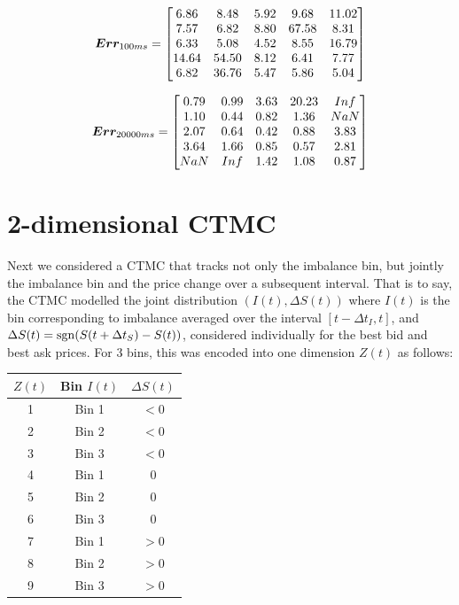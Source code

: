 $$\boldsymbol{Err}_{100ms} = \begin{bmatrix}
    6.86 &   8.48 &   5.92 &   9.68 &  11.02\\
    7.57 &   6.82 &   8.80 &  67.58 &   8.31\\
    6.33 &   5.08 &   4.52 &   8.55 &  16.79\\
   14.64 &  54.50 &   8.12 &   6.41 &   7.77\\
    6.82 &  36.76 &   5.47 &   5.86 &   5.04
\end{bmatrix}$$

$$\boldsymbol{Err}_{20000ms} = \begin{bmatrix}
    0.79 &   0.99 &   3.63 &  20.23 &    Inf\\
    1.10 &   0.44 &   0.82 &   1.36 &    NaN\\
    2.07 &   0.64 &   0.42 &   0.88 &   3.83\\
    3.64 &   1.66 &   0.85 &   0.57 &   2.81\\
     NaN &    Inf &   1.42 &   1.08 &   0.87
\end{bmatrix}$$

\section{2-dimensional CTMC}
Next we considered a CTMC that tracks not only the imbalance bin, but jointly the imbalance bin and the price change over a subsequent interval. That is to say, the CTMC modelled the joint distribution $(I(t), \Delta S(t))$ where $I(t)$ is the bin corresponding to imbalance averaged over the interval $[t-\Delta t_I, t]$, and $\Delta S(t) = \operatorname{\mathrm{sgn}}(S(t+\Delta t_S)-S(t))$, considered individually for the best bid and best ask prices. For 3 bins, this was encoded into one dimension $Z(t)$ as follows:

\begin{table}[H]
\small
\centering
\vspace*{2.5mm}
\begin{tabular}{c|c|c}
\hline
$Z(t)$ & Bin $I(t)$ & $\Delta S(t)$ \\
\hline\hline
1 & Bin 1 & $<0$ \\
\hline
2 & Bin 2 & $<0$ \\
\hline
3 & Bin 3 & $<0$ \\
\hline
4 & Bin 1 & $0$ \\
\hline
5 & Bin 2 & $0$ \\
\hline
6 & Bin 3 & $0$ \\
\hline
7 & Bin 1 & $>0$ \\
\hline
8 & Bin 2 & $>0$ \\
\hline
9 & Bin 3 & $>0$ \\
\hline
\end{tabular}
\end{table}

